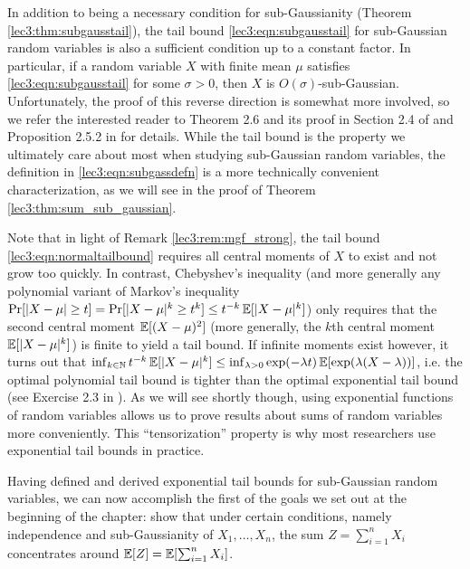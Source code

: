 \begin{remark}\label{lec3:rem:tail_bound_remark}
    In addition to being a necessary condition for sub-Gaussianity (Theorem \ref{lec3:thm:subgausstail}), the tail bound \eqref{lec3:eqn:subgausstail} for sub-Gaussian random variables is also a sufficient condition up to a constant factor. In particular, if a random variable $X$ with finite mean $\mu$ satisfies \eqref{lec3:eqn:subgausstail} for some $\sigma > 0$, then $X$ is $O(\sigma)$-sub-Gaussian. Unfortunately, the proof of this reverse direction is somewhat more involved, so we refer the interested reader to Theorem 2.6 and its proof in Section 2.4 of \cite{wainwright2019high} and Proposition 2.5.2 in \cite{vershynin2018high} for details. While the tail bound is the property we ultimately care about most when studying sub-Gaussian random variables, the definition in \eqref{lec3:eqn:subgassdefn} is a more technically convenient characterization, as we will see in the proof of Theorem \ref{lec3:thm:sum_sub_gaussian}.
\end{remark}

\begin{remark}
    Note that in light of Remark \ref{lec3:rem:mgf_strong}, the tail bound \eqref{lec3:eqn:normaltailbound} requires all central moments of $X$ to exist and not grow too quickly. In contrast, Chebyshev's inequality (and more generally any polynomial variant of Markov's inequality $\Pr[|X-\mu| \geq t] = \Pr[|X-\mu|^k \geq t^k] \leq t^{-k}\operatorname*{\mathbb{E}}[|X-\mu|^k]$) only requires that the second central moment $\operatorname*{\mathbb{E}}[(X-\mu)^2]$ (more generally, the $k$th central moment $\operatorname*{\mathbb{E}}[|X - \mu|^k]$) is finite to yield a tail bound. If infinite moments exist however, it turns out that $\inf_{k \in \mathbb{N}} t^{-k}\operatorname*{\mathbb{E}}[|X-\mu|^k] \leq \inf_{\lambda > 0} \exp(-\lambda t) \operatorname*{\mathbb{E}}[\exp(\lambda (X-\lambda))]$, i.e. the optimal polynomial tail bound is tighter than the optimal exponential tail bound (see Exercise 2.3 in \cite{wainwright2019high}). As we will see shortly though, using exponential functions of random variables allows us to prove results about sums of random variables more conveniently. This ``tensorization'' property is why most researchers use exponential tail bounds in practice.
\end{remark}

Having defined and derived exponential tail bounds for sub-Gaussian random variables, we can now accomplish the first of the goals we set out at the beginning of the chapter: show that under certain conditions, namely independence and sub-Gaussianity of $X_1, \dotsc, X_n$, the sum $Z = \sum_{i = 1}^n X_i$ concentrates around $\operatorname*{\mathbb{E}}[Z] = \operatorname*{\mathbb{E}}[\sum_{i = 1}^n X_i]$.

